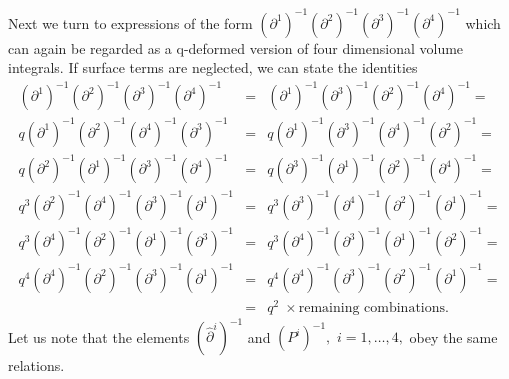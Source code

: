 \documentclass[a4paper,11pt,oneside]{article}
\newcommand{\text}[1]{\mbox{#1}}
\begin{document}
Next we turn to expressions of the form $\left( \partial ^{1}\right)
^{-1}\left( \partial ^{2}\right) ^{-1}\left( \partial ^{3}\right)
^{-1}\left( \partial ^{4}\right) ^{-1}$ which can again be regarded as a
q-deformed version of four dimensional volume integrals. If surface terms
are neglected, we can state the identities 
\begin{eqnarray}
\left( \partial ^{1}\right) ^{-1}\left( \partial ^{2}\right) ^{-1}\left(
\partial ^{3}\right) ^{-1}\left( \partial ^{4}\right) ^{-1} &=&\left(
\partial ^{1}\right) ^{-1}\left( \partial ^{3}\right) ^{-1}\left( \partial
^{2}\right) ^{-1}\left( \partial ^{4}\right) ^{-1}=  \label{volume4} \\
q\left( \partial ^{1}\right) ^{-1}\left( \partial ^{2}\right) ^{-1}\left(
\partial ^{4}\right) ^{-1}\left( \partial ^{3}\right) ^{-1} &=&q\left(
\partial ^{1}\right) ^{-1}\left( \partial ^{3}\right) ^{-1}\left( \partial
^{4}\right) ^{-1}\left( \partial ^{2}\right) ^{-1}=  \nonumber \\
q\left( \partial ^{2}\right) ^{-1}\left( \partial ^{1}\right) ^{-1}\left(
\partial ^{3}\right) ^{-1}\left( \partial ^{4}\right) ^{-1} &=&q\left(
\partial ^{3}\right) ^{-1}\left( \partial ^{1}\right) ^{-1}\left( \partial
^{2}\right) ^{-1}\left( \partial ^{4}\right) ^{-1}=  \nonumber \\
q^{3}\left( \partial ^{2}\right) ^{-1}\left( \partial ^{4}\right)
^{-1}\left( \partial ^{3}\right) ^{-1}\left( \partial ^{1}\right) ^{-1}
&=&q^{3}\left( \partial ^{3}\right) ^{-1}\left( \partial ^{4}\right)
^{-1}\left( \partial ^{2}\right) ^{-1}\left( \partial ^{1}\right) ^{-1}= 
\nonumber \\
q^{3}\left( \partial ^{4}\right) ^{-1}\left( \partial ^{2}\right)
^{-1}\left( \partial ^{1}\right) ^{-1}\left( \partial ^{3}\right) ^{-1}
&=&q^{3}\left( \partial ^{4}\right) ^{-1}\left( \partial ^{3}\right)
^{-1}\left( \partial ^{1}\right) ^{-1}\left( \partial ^{2}\right) ^{-1}= 
\nonumber \\
q^{4}\left( \partial ^{4}\right) ^{-1}\left( \partial ^{2}\right)
^{-1}\left( \partial ^{3}\right) ^{-1}\left( \partial ^{1}\right) ^{-1}
&=&q^{4}\left( \partial ^{4}\right) ^{-1}\left( \partial ^{3}\right)
^{-1}\left( \partial ^{2}\right) ^{-1}\left( \partial ^{1}\right) ^{-1}= 
\nonumber \\
&=&q^{2}\;\times \text{remaining combinations.}  \nonumber
\end{eqnarray} 
Let us note that the elements $\left( \hat{\partial}^{i}\right) ^{-1}$ and $%
\left( P^{i}\right) ^{-1},$ $i=1,\ldots ,4,$ obey the same relations.
\end{document}
